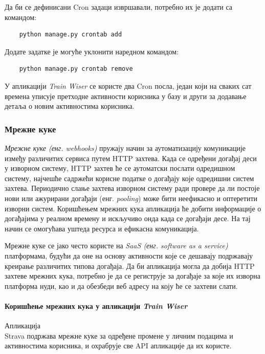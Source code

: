 \documentclass[12pt,oneside]{memoir}
\begin{document}
Да би се дефинисани Cron задаци извршавали, потребно их је додати са командом:

\begin{lstlisting}
    python manage.py crontab add
\end{lstlisting}

Додате задатке је могуће уклонити наредном командом:

\begin{lstlisting}
    python manage.py crontab remove
\end{lstlisting}

У апликацији \textit{Train Wiser} се користе два Cron посла, један који на сваких сат времена уписује претходне активности корисника у базу и други за додавање детаља о новим активностима корисника.

\subsubsection{Мрежне куке}

\textit{Мрежне куке (енг. webhooks)} пружају начин за аутоматизацију комуникације између различитих сервиса путем HTTP захтева. Када се одређени догађај деси у изворном систему, HTTP захтев ће се аутоматски послати одредишном систему, најчешће садржећи корисне податке о догађају које одредишни систем захтева. Периодично слање захтева изворном систему ради провере да ли постоје нови или ажурирани догађаји (енг. \textit{pooling}) може бити неефикасно и оптеретити изворни систем. Коришћењем мрежних кука апликација ће добити информације о догађајима у реалном времену и искључиво онда када се догађаји десе. На тај начин се омогућава уштеда ресурса и ефикасна комуникација. 

Мрежне куке се јако често користе на \textit{SaaS (енг. software as a service)} платформама, будући да оне на основу активности које се дешавају подржавају креирање различитих типова догађаја. Да би апликација могла да добија HTTP захтеве мрежних кука, потребно је да се региструје за догађаје за које их изворна платформа нуди, као и да обезбеди веб адресу на коју ће се захтеви слати. \cite{webhooks_hookdeck, strava_webhooks}

\paragraph{Коришћење мрежних кука у апликацији \textit{Train Wiser}} Апликација \\ 
Strava подржава мрежне куке за одређене промене у личним подацима 
и активностима корисника, и охрабрује све API апликације да их користе. 
\end{document}

